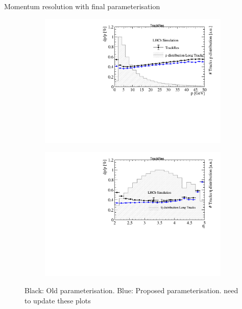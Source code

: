 \documentclass[xcolor={dvipsnames}]{beamer}
\begin{document}
\begin{frame}{Momentum resolution with final parameterisation}
  \vspace{0.0cm}
  \begin{figure}[htb]
    \centering
    \begin{subfigure}{0.50\textwidth}
      \includegraphics[width=1\textwidth]{Plots/Track_resolution_p_comparison.pdf}
    \end{subfigure}%
    \begin{subfigure}{0.50\textwidth}
      \includegraphics[width=1\textwidth]{Plots/Track_resolution_eta_comparison.pdf}
    \end{subfigure}
    \vspace{-0.2cm}
    \caption*{Black: Old parameterisation. {\color{blue}Blue: Proposed parameterisation}. {\color{red}need to update these plots}}
  \end{figure}
\end{frame}
\end{document}

